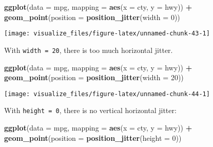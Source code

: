 \documentclass[]{book}
\newenvironment{Shaded}{\begin{snugshade}}{\end{snugshade}}
\newcommand{\DataTypeTok}[1]{\textcolor[rgb]{0.13,0.29,0.53}{#1}}
\newcommand{\DecValTok}[1]{\textcolor[rgb]{0.00,0.00,0.81}{#1}}
\newcommand{\KeywordTok}[1]{\textcolor[rgb]{0.13,0.29,0.53}{\textbf{#1}}}
\newcommand{\NormalTok}[1]{#1}
\newcommand{\OperatorTok}[1]{\textcolor[rgb]{0.81,0.36,0.00}{\textbf{#1}}}
\newcommand{\StringTok}[1]{\textcolor[rgb]{0.31,0.60,0.02}{#1}}
\theoremstyle{plain}
\theoremstyle{remark}
\begin{document}
\begin{Shaded}
\begin{Highlighting}[]
\KeywordTok{ggplot}\NormalTok{(}\DataTypeTok{data =}\NormalTok{ mpg, }\DataTypeTok{mapping =} \KeywordTok{aes}\NormalTok{(}\DataTypeTok{x =}\NormalTok{ cty, }\DataTypeTok{y =}\NormalTok{ hwy)) }\OperatorTok{+}
\StringTok{  }\KeywordTok{geom_point}\NormalTok{(}\DataTypeTok{position =} \KeywordTok{position_jitter}\NormalTok{(}\DataTypeTok{width =} \DecValTok{0}\NormalTok{))}
\end{Highlighting}
\end{Shaded}

\begin{center}\texttt{[image: visualize\_files/figure-latex/unnamed-chunk-43-1]} \end{center}

With \texttt{width\ =\ 20}, there is too much horizontal jitter.

\begin{Shaded}
\begin{Highlighting}[]
\KeywordTok{ggplot}\NormalTok{(}\DataTypeTok{data =}\NormalTok{ mpg, }\DataTypeTok{mapping =} \KeywordTok{aes}\NormalTok{(}\DataTypeTok{x =}\NormalTok{ cty, }\DataTypeTok{y =}\NormalTok{ hwy)) }\OperatorTok{+}
\StringTok{  }\KeywordTok{geom_point}\NormalTok{(}\DataTypeTok{position =} \KeywordTok{position_jitter}\NormalTok{(}\DataTypeTok{width =} \DecValTok{20}\NormalTok{))}
\end{Highlighting}
\end{Shaded}

\begin{center}\texttt{[image: visualize\_files/figure-latex/unnamed-chunk-44-1]} \end{center}

With \texttt{height\ =\ 0}, there is no vertical horizontal jitter:

\begin{Shaded}
\begin{Highlighting}[]
\KeywordTok{ggplot}\NormalTok{(}\DataTypeTok{data =}\NormalTok{ mpg, }\DataTypeTok{mapping =} \KeywordTok{aes}\NormalTok{(}\DataTypeTok{x =}\NormalTok{ cty, }\DataTypeTok{y =}\NormalTok{ hwy)) }\OperatorTok{+}
\StringTok{  }\KeywordTok{geom_point}\NormalTok{(}\DataTypeTok{position =} \KeywordTok{position_jitter}\NormalTok{(}\DataTypeTok{height =} \DecValTok{0}\NormalTok{))}
\end{Highlighting}
\end{Shaded}
\end{document}

